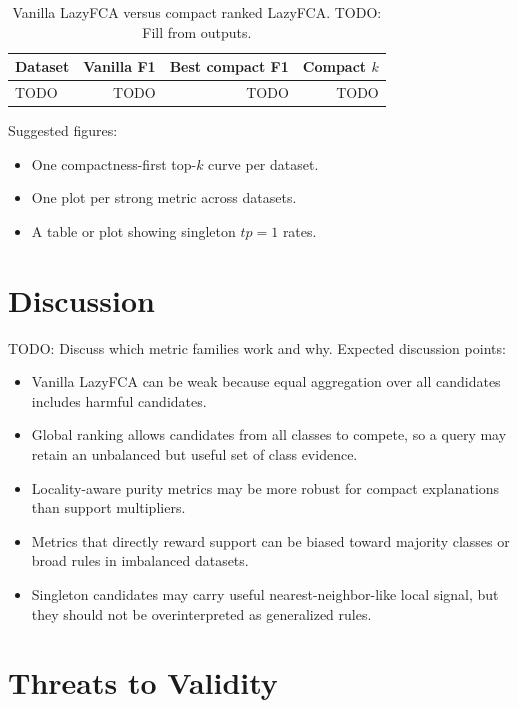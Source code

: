 \documentclass[11pt]{article}
\begin{document}
\begin{table}[h]
\centering
\caption{Vanilla LazyFCA versus compact ranked LazyFCA. TODO: Fill from outputs.}
\begin{tabular}{lrrr}
\toprule
Dataset & Vanilla F1 & Best compact F1 & Compact $k$ \\
\midrule
TODO & TODO & TODO & TODO \\
\bottomrule
\end{tabular}
\end{table}

Suggested figures:

\begin{itemize}[leftmargin=*]
    \item One compactness-first top-$k$ curve per dataset.
    \item One plot per strong metric across datasets.
    \item A table or plot showing singleton $tp=1$ rates.
\end{itemize}

\section{Discussion}

TODO: Discuss which metric families work and why. Expected discussion points:

\begin{itemize}[leftmargin=*]
    \item Vanilla LazyFCA can be weak because equal aggregation over all
    candidates includes harmful candidates.
    \item Global ranking allows candidates from all classes to compete, so a
    query may retain an unbalanced but useful set of class evidence.
    \item Locality-aware purity metrics may be more robust for compact
    explanations than support multipliers.
    \item Metrics that directly reward support can be biased toward majority
    classes or broad rules in imbalanced datasets.
    \item Singleton candidates may carry useful nearest-neighbor-like local
    signal, but they should not be overinterpreted as generalized rules.
\end{itemize}

\section{Threats to Validity}
\end{document}

